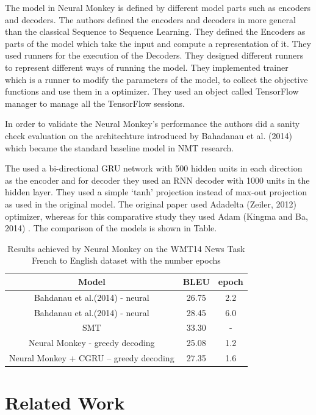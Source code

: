 The model in Neural Monkey is defined by different model parts such as encoders and decoders. The authors defined the encoders and decoders in more general than the classical Sequence to Sequence Learning. They defined the Encoders as parts of the model which take the input and compute a representation of it. They used runners for the execution of the Decoders. They designed different runners to represent different ways of running the model. They implemented trainer which is a runner to modify the parameters of the model, to collect the objective functions and use them in a optimizer. They used an object called TensorFlow manager to manage all the TensorFlow sessions. 

In order to validate the Neural Monkey’s performance the authors did a sanity check evaluation on the architechture introduced by Bahadanau et al. (2014) which became the standard baseline model in NMT research. 








The used a bi-directional GRU network with 500 hidden units in each direction as the encoder and for decoder they used an RNN decoder with 1000 units in the hidden layer. They used a simple ‘tanh’ projection instead of max-out projection as used in the original model. The original paper used Adadelta (Zeiler, 2012) optimizer, whereas for this comparative study they used Adam (Kingma and Ba, 2014) . The comparison of the models is shown in Table. 

\begin{table}[h!]
\centering
 \begin{tabular}{ |c|c|c| } 
  \hline Model & BLEU & epoch \\ 
  \hline  Bahdanau et al.(2014) - neural & 26.75 & 2.2\\
  Bahdanau et al.(2014) - neural & 28.45 & 6.0\\
  SMT & 33.30 & -\\
  \hline Neural Monkey - greedy decoding & 25.08 & 1.2\\
  Neural Monkey + CGRU – greedy decoding  & 27.35 & 1.6\\
  \hline
 \end{tabular}
\caption{Results achieved by Neural Monkey on the WMT14 News Task French to English dataset with the number epochs}
\end{table}

\section{Related Work}
